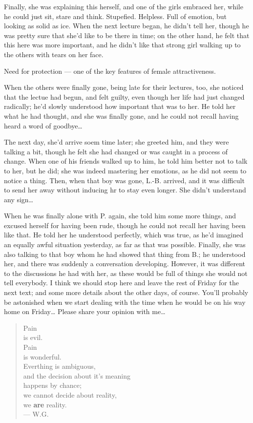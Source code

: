 Finally, she was explaining this herself, and one of the girls embraced her, while he could just sit, stare and think. Stupefied. Helpless. Full of emotion, but looking as solid as ice. 
When the next lecture began, he didn't tell her, though he was pretty sure that she'd like to be there in time; on the other hand, he felt that this here was more important, and he didn't like that strong girl walking up to the others with tears on her face.

Need for protection --- one of the key features of female attractiveness.

When the others were finally gone, being late for their lectures, too, she noticed that the lectue had begun, and felt guilty, even though her life had just changed radically; he'd slowly understood how important that was to her. He told her what he had thought, and she was finally gone, and he could not recall having heard a word of goodbye\dots{}

The next day, she'd arrive soem time later; she greeted him, and they were talking a bit, though he felt she had changed or was caught in a process of change. When one of his friends walked up to him, he told him better not to talk to her, but he did; she was indeed mastering her emotions, as he did not seem to notice a thing. Then, when that boy was gone, L.-B. arrived, and it was difficult to send her away without inducing hr to stay even longer. She didn't understand any sign\dots{}

When he was finally alone with P. again, she told him some more things, and excused herself for having been rude, though he could not recall her having been like that. He told her he understood perfectly, which was true, as he'd imagined an equally awful situation yesterday, as far as that was possible. Finally, she was also talking to that boy whom he had showed that thing from B.; he understood her, and there was suddenly a conversation developing. However, it was different to the discussions he had with her, as these would be full of things she would not tell everybody. 
I think we should stop here and leave the rest of Friday for the next text; and some more details about the other days, of course. You'll probably be astonished when we start dealing with the time when he would be on his way home on Friday\dots{}
Please share your opinion with me\dots{}

\begin{quote}
Pain \\
is evil. \\
Pain \\
is wonderful. \\
Everthing is ambiguous, \\
and the decision about it's meaning \\
happens by chance; \\
we cannot decide about reality, \\
we \textbf{are} reality. \\
--- W.G.
\end{quote}

